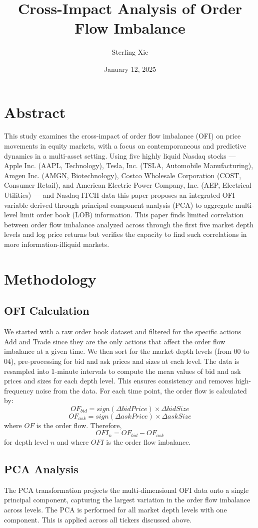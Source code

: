 \documentclass{article}
\title{Cross-Impact Analysis of Order Flow Imbalance}
\author{Sterling Xie}
\date{January 12, 2025}
\begin{document}
\maketitle

\section{Abstract}
This study examines the cross-impact of order flow imbalance (OFI) on price movements in equity markets, with a focus on contemporaneous and predictive dynamics in a multi-asset setting. Using five highly liquid Nasdaq stocks — Apple Inc. (AAPL, Technology), Tesla, Inc. (TSLA, Automobile Manufacturing), Amgen Inc. (AMGN, Biotechnology), Costco Wholesale Corporation (COST, Consumer Retail), and American Electric Power Company, Inc. (AEP, Electrical Utilities) — and Nasdaq ITCH data this paper proposes an integrated OFI variable derived through principal component analysis (PCA) to aggregate multi-level limit order book (LOB) information. This paper finds limited correlation between order flow imbalance analyzed across through the first five market depth levels and log price returns but verifies the capacity to find such correlations in more information-illiquid markets.

\section{Methodology}
\subsection{OFI Calculation}
We started with a raw order book dataset and filtered for the specific actions Add and Trade since they are the only actions that affect the order flow imbalance at a given time. We then sort for the market depth levels (from 00 to 04), pre-processing for bid and ask prices and sizes at each level. The data is resampled into 1-minute intervals to compute the mean values of bid and ask prices and sizes for each depth level. This ensures consistency and removes high-frequency noise from the data. For each time point, the order flow is calculated by:\\
$$ OF_{bid} = sign(\Delta bidPrice) \times \Delta bidSize $$
$$ OF_{ask} = sign(\Delta askPrice) \times \Delta askSize $$
where $ OF $ is the order flow.
Therefore,
$$ OFI_n = OF_{bid} - OF_{ask} $$
for depth level $ n $ and where $ OFI $ is the order flow imbalance.

\subsection{PCA Analysis}
The PCA transformation projects the multi-dimensional OFI data onto a single principal component, capturing the largest variation in the order flow imbalance across levels. The PCA is performed for all market depth levels with one component. This is applied across all tickers discussed above.
\end{document}
